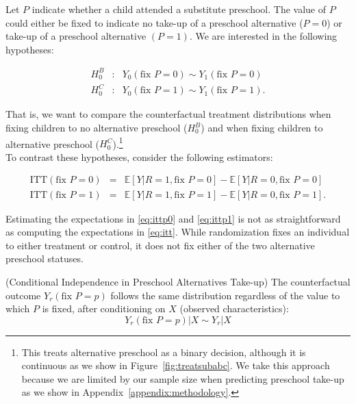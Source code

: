 \noindent Let $P$ indicate whether a child attended a substitute preschool. The value of $P$ could either be fixed to indicate no take-up of a preschool alternative ($P = 0$) or take-up of a preschool alternative $(P = 1)$. We are interested in the following hypotheses: 

\begin{eqnarray}
H_{0}^B &:& Y_{0} \left( \text{fix } P = 0 \right) \sim Y_{1} \left( \text{fix } P = 0 \right) \label{eq:hoB} \\
H_{0}^C &:& Y_{0} \left( \text{fix } P = 1 \right) \sim Y_{1} \left( \text{fix } P = 1\right) \label{eq:hoC}. 
\end{eqnarray}

\noindent That is, we want to compare the counterfactual treatment distributions when fixing children to no alternative preschool ($H_{0}^B$) and when fixing children to alternative preschool ($H_{0}^C$).\footnote{This treats alternative preschool as a binary decision, although it is continuous as we show in Figure~\ref{fig:treatsubabc}. We take this approach because we are limited by our sample size when predicting preschool take-up as we show in Appendix~\ref{appendix:methodology}.}\\

\noindent To contrast these hypotheses, consider the following estimators: 

\begin{eqnarray}
\text{ITT} \left( \text{fix } P = 0 \right) &=& \mathbb{E} \left[ Y | R = 1, \text{fix } P = 0 \right] - \mathbb{E} \left[ Y | R = 0, \text{fix } P = 0 \right] \label{eq:ittp0} \\
\text{ITT} \left( \text{fix } P = 1 \right) &=& \mathbb{E} \left[ Y | R = 1, \text{fix } P = 1 \right] - \mathbb{E} \left[ Y | R = 0, \text{fix } P = 1 \right]. \label{eq:ittp1}  
\end{eqnarray}

\noindent Estimating the expectations in \eqref{eq:ittp0} and \eqref{eq:ittp1} is not as straightforward as computing the expectations in \eqref{eq:itt}. While randomization fixes an individual to either treatment or control, it does not fix either of the two alternative preschool statuses.\\

\begin{assumption} \normalfont \label{assumption:matching} (Conditional Independence in Preschool Alternatives Take-up) The counterfactual outcome $Y_{r} \left( \text{fix } P=p \right)$ follows the same distribution regardless of the value to which $P$ is fixed, after conditioning on $X$ (observed characteristics): 
\begin{equation}
Y_{r} \left( \text{fix } P=p \right) | X \sim Y_{r}  | X 
\end{equation}
 \end{assumption}

